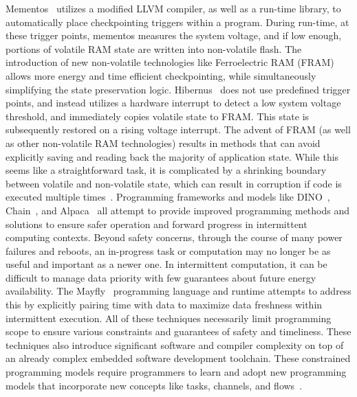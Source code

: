 Mementos~\cite{ransford2012mementos} utilizes a modified LLVM compiler, as well as a run-time library, to automatically place checkpointing triggers within a program. During run-time, at these trigger points, mementos measures the system voltage, and if low enough, portions of volatile RAM state are written into non-volatile flash.
The introduction of new non-volatile technologies like Ferroelectric RAM (FRAM) allows more energy and time efficient checkpointing, while simultaneously simplifying the state preservation logic. Hibernus~\cite{balsamo2014hibernus} does not use predefined trigger points, and instead utilizes a hardware interrupt to detect a low system voltage threshold, and immediately copies volatile state to FRAM. This state is subsequently restored on a rising voltage interrupt. 
The advent of FRAM (as well as other non-volatile RAM technologies) results in methods that can avoid explicitly saving and reading back the majority of application state.
While this seems like a straightforward task, it is complicated by a shrinking 
boundary between volatile and non-volatile state, which can result in corruption if code is executed multiple times~\cite{maeng2017alpaca}. 
Programming frameworks and models like DINO~\cite{lucia2015simpler}, Chain~\cite{colin2016chain}, 
and Alpaca~\cite{maeng2017alpaca} all attempt to provide improved programming methods and solutions to ensure safer operation and forward progress in intermittent computing contexts.
Beyond safety concerns, through the course of many power failures and reboots, an in-progress task or computation may no longer be as useful and important as a newer one. 
In intermittent computation, it can be difficult to manage data priority with few guarantees about future energy availability. The Mayfly~\cite{hesterTimely17} programming language and runtime attempts to address this by explicitly pairing time with data to maximize data freshness within intermittent execution. 
All of these techniques necessarily limit programming scope to ensure various constraints and guarantees of safety and timeliness. These techniques also introduce significant software and compiler complexity on top of an already complex embedded software development toolchain.
These constrained programming models require programmers to learn and adopt new programming models that incorporate new concepts like tasks, channels, and flows~\cite{colin2016chain,maeng2017alpaca,hesterTimely17}.

